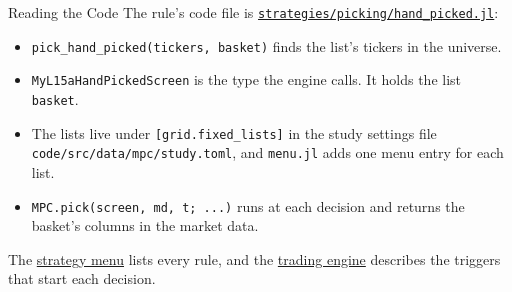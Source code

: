 \documentclass[aspectratio=169,11pt]{beamer}
\newcommand{\repo}{https://github.com/varnerlab/CHEME-5660-CourseRepository-Fall-2026/blob/main/lectures/week-15/L15a}
\begin{document}
\begin{frame}{Reading the Code}
  \vspace{0.3em}
  The rule's code file is
  \href{\repo/strategies/picking/hand_picked.jl}{\texttt{strategies/picking/hand\_picked.jl}}:
  \begin{itemize}\setlength{\itemsep}{0.5em}
    \item \texttt{pick\_hand\_picked(tickers, basket)} finds the list's tickers in the universe.
    \item \texttt{MyL15aHandPickedScreen} is the type the engine calls. It holds the list \texttt{basket}.
    \item The lists live under \texttt{[grid.fixed\_lists]} in the study settings file \texttt{code/src/data/mpc/study.toml}, and \texttt{menu.jl} adds one menu entry for each list.
    \item \texttt{MPC.pick(screen, md, t; ...)} runs at each decision and returns the basket's columns in the market data.
  \end{itemize}

  \vspace{0.5em}
  The \href{\repo/strategies/CHEME-5660-L15a-Strategy-Menu-Fall-2026.ipynb}{strategy menu} lists every rule, and the \href{\repo/engine/CHEME-5660-L15a-Trading-Engine-Fall-2026.ipynb}{trading engine} describes the triggers that start each decision.
\end{frame}
\end{document}
